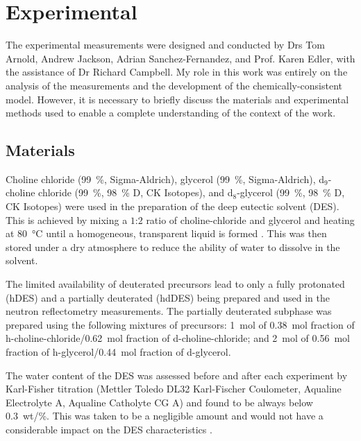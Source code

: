 \section{Experimental}
The experimental measurements were designed and conducted by Drs Tom Arnold, Andrew Jackson, Adrian Sanchez-Fernandez, and Prof. Karen Edler, with the assistance of Dr Richard Campbell.
My role in this work was entirely on the analysis of the measurements and the development of the chemically-consistent model.
However, it is necessary to briefly discuss the materials and experimental methods used to enable a complete understanding of the context of the work.

\subsection{Materials}
Choline chloride (\SI{99}{\percent}, Sigma-Aldrich), glycerol (\SI{99}{\percent}, Sigma-Aldrich), d$_{9}$-choline chloride (\SI{99}{\percent}, \SI{98}{\percent} D, CK Isotopes), and d$_{8}$-glycerol (\SI{99}{\percent}, \SI{98}{\percent} D, CK Isotopes) were used in the preparation of the deep eutectic solvent (DES).
This is achieved by mixing a $1$:$2$ ratio of choline-chloride and glycerol and heating at \SI{80}{\celsius} until a homogeneous, transparent liquid is formed \cite{smith_deep_2014}.
This was then stored under a dry atmosphere to reduce the ability of water to dissolve in the solvent.

The limited availability of deuterated precursors lead to only a fully protonated (hDES) and a partially deuterated (hdDES) being prepared and used in the neutron reflectometry measurements.
The partially deuterated subphase was prepared using the following mixtures of precursors: \SI{1}{\mole} of \SI{0.38}{\mole} fraction of h-choline-chloride/\SI{0.62}{\mole} fraction of d-choline-chloride; and \SI{2}{\mole} of \SI{0.56}{\mole} fraction of h-glycerol/\SI{0.44}{\mole} fraction of d-glycerol.

The water content of the DES was assessed before and after each experiment by Karl-Fisher titration (Mettler Toledo DL32 Karl-Fischer Coulometer, Aqualine Electrolyte A, Aqualine Catholyte CG A) and found to be always below \SI{0.3}{wt/\percent}.
This was taken to be a negligible amount and would not have a considerable impact on the DES characteristics \cite{hammond_liquid_2016,hammond_resilience_2017}.

